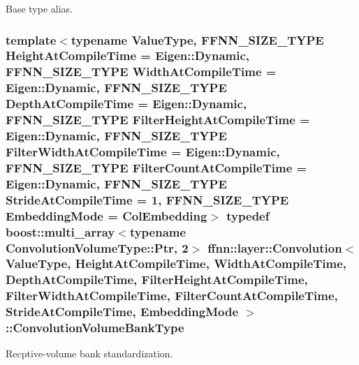 Base type alias. 

\hypertarget{classffnn_1_1layer_1_1_convolution_ab9d4759c7f52bcd098fb88382cc450a3}{
\subsubsection[{Convolution\-Volume\-Bank\-Type}]{\setlength{\rightskip}{0pt plus 5cm}template$<$typename Value\-Type, F\-F\-N\-N\-\_\-\-S\-I\-Z\-E\-\_\-\-T\-Y\-P\-E Height\-At\-Compile\-Time = Eigen\-::\-Dynamic, F\-F\-N\-N\-\_\-\-S\-I\-Z\-E\-\_\-\-T\-Y\-P\-E Width\-At\-Compile\-Time = Eigen\-::\-Dynamic, F\-F\-N\-N\-\_\-\-S\-I\-Z\-E\-\_\-\-T\-Y\-P\-E Depth\-At\-Compile\-Time = Eigen\-::\-Dynamic, F\-F\-N\-N\-\_\-\-S\-I\-Z\-E\-\_\-\-T\-Y\-P\-E Filter\-Height\-At\-Compile\-Time = Eigen\-::\-Dynamic, F\-F\-N\-N\-\_\-\-S\-I\-Z\-E\-\_\-\-T\-Y\-P\-E Filter\-Width\-At\-Compile\-Time = Eigen\-::\-Dynamic, F\-F\-N\-N\-\_\-\-S\-I\-Z\-E\-\_\-\-T\-Y\-P\-E Filter\-Count\-At\-Compile\-Time = Eigen\-::\-Dynamic, F\-F\-N\-N\-\_\-\-S\-I\-Z\-E\-\_\-\-T\-Y\-P\-E Stride\-At\-Compile\-Time = 1, F\-F\-N\-N\-\_\-\-S\-I\-Z\-E\-\_\-\-T\-Y\-P\-E Embedding\-Mode = Col\-Embedding$>$ typedef boost\-::multi\-\_\-array$<$typename {\bf Convolution\-Volume\-Type\-::\-Ptr}, 2$>$ {\bf ffnn\-::layer\-::\-Convolution}$<$ Value\-Type, Height\-At\-Compile\-Time, Width\-At\-Compile\-Time, Depth\-At\-Compile\-Time, Filter\-Height\-At\-Compile\-Time, Filter\-Width\-At\-Compile\-Time, Filter\-Count\-At\-Compile\-Time, Stride\-At\-Compile\-Time, {\bf Embedding\-Mode} $>$\-::{\bf Convolution\-Volume\-Bank\-Type}}}\label{classffnn_1_1layer_1_1_convolution_ab9d4759c7f52bcd098fb88382cc450a3}


Recptive-\/volume bank standardization. 

